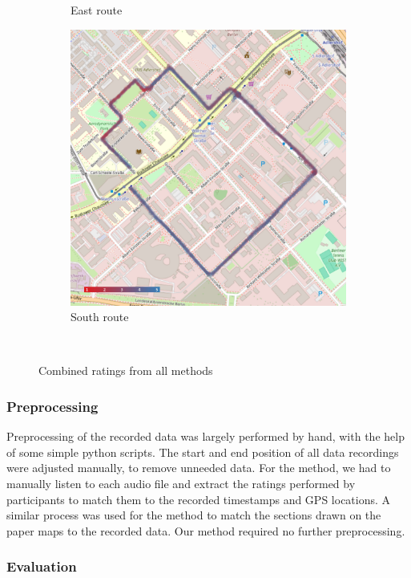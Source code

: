 \begin{figure}[!htb]
\begin{subfigure}{.3333\textwidth}
        \caption{East route}
        \label{fig:ratings_east_route}
    \end{subfigure}%
    \begin{subfigure}{.3333\textwidth}
        \centering
        \includegraphics[width=.9\linewidth]{images/ratings_south_route.jpg}
        \caption{South route}
        \label{fig:ratings_south_route}
    \end{subfigure}\
    \caption{Combined ratings from all methods}
    \label{fig:route_ratings}
\end{figure}

\subsubsection{Preprocessing}\label{subsec:preprocessing}

Preprocessing of the recorded data was largely performed by hand, with the help of some simple python scripts.
The start and end position of all data recordings were adjusted manually, to remove unneeded data.
For the \audiorecording method, we had to manually listen to each audio file and extract the ratings performed by participants to match them to the recorded timestamps and GPS locations.
A similar process was used for the \mapping method to match the sections drawn on the paper maps to the recorded data.
Our \likertshift method required no further preprocessing.

\subsubsection{Evaluation}

